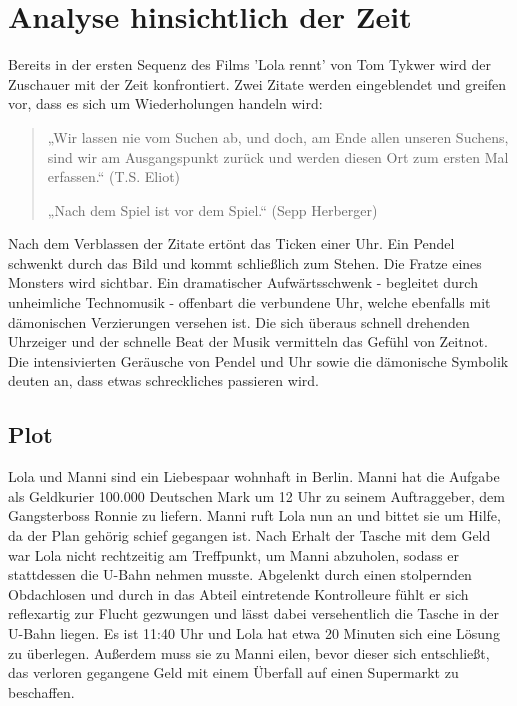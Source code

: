 



\usepackage{chngcntr}



%



\thispagestyle{plain}
\pagestyle{plain}

\tableofcontents

\listoffigures


\section{Analyse hinsichtlich der Zeit}

Bereits in der ersten Sequenz des Films 'Lola rennt' von Tom Tykwer wird der Zuschauer mit der Zeit konfrontiert. Zwei Zitate werden eingeblendet und greifen vor, dass es sich um Wiederholungen handeln wird: 

\begin{quote}
„Wir lassen nie vom Suchen ab, und doch, am Ende allen unseren Suchens, sind wir am Ausgangspunkt zurück und werden diesen Ort zum ersten Mal erfassen.“ (T.S. Eliot)
\par„Nach dem Spiel ist vor dem Spiel.“ (Sepp Herberger)
\end{quote}

Nach dem Verblassen der Zitate ertönt das Ticken einer Uhr. Ein Pendel schwenkt durch das Bild und kommt schließlich zum Stehen. Die Fratze eines Monsters wird sichtbar. Ein dramatischer Aufwärtsschwenk - begleitet durch unheimliche Technomusik - offenbart die verbundene Uhr, welche ebenfalls mit dämonischen Verzierungen versehen ist. Die sich überaus schnell drehenden Uhrzeiger und der schnelle Beat der Musik vermitteln das Gefühl von Zeitnot. Die intensivierten Geräusche von Pendel und Uhr sowie die dämonische Symbolik deuten an, dass etwas schreckliches passieren wird.

\subsection{Plot}

Lola und Manni sind ein Liebespaar wohnhaft in Berlin. Manni hat die Aufgabe als Geldkurier 100.000 Deutschen Mark um 12 Uhr zu seinem Auftraggeber, dem Gangsterboss Ronnie zu liefern. Manni ruft Lola nun an und bittet sie um Hilfe, da der Plan gehörig schief gegangen ist. Nach Erhalt der Tasche mit dem Geld war Lola nicht rechtzeitig am Treffpunkt, um Manni abzuholen, sodass er stattdessen die U-Bahn nehmen musste. Abgelenkt durch einen stolpernden Obdachlosen und durch in das Abteil eintretende Kontrolleure fühlt er sich reflexartig zur Flucht gezwungen und lässt dabei versehentlich die Tasche in der U-Bahn liegen. Es ist 11:40 Uhr und Lola hat etwa 20 Minuten sich eine Lösung zu überlegen. Außerdem muss sie zu Manni eilen, bevor dieser sich entschließt, das verloren gegangene Geld mit einem Überfall auf einen Supermarkt zu beschaffen.

